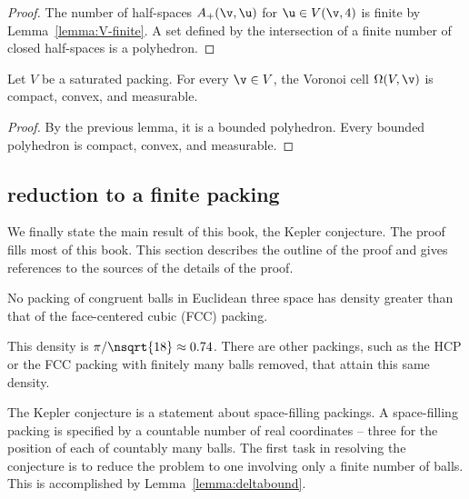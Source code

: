 \begin{cnl}
\begin{proof}
The number of half-spaces $\Aplus(\v,\u)$ for $\u\in \Vee{V}(\v,4)$ is finite by
Lemma~\ref{lemma:V-finite}.  A set defined by the intersection of a finite number
of closed half-spaces is a polyhedron.
\end{proof}

\begin{lemma}
\label{lemma:Voronoi-compact}
Let $ V$ be a saturated packing.  For every $\v\in  V$, 
the Voronoi cell $\Omega( V,\v)$  is
compact, convex, and measurable.
\end{lemma}

\begin{proof} By the previous lemma, it is a bounded polyhedron.
  Every bounded polyhedron is compact, convex, and measurable.
\end{proof}




\subsection{reduction to a finite packing}\label{reduction to finite}

We finally state the main result of this book, the Kepler conjecture.
The proof fills most of this book. This section describes the
outline of the proof and gives references to the sources of the
details of the proof.


\begin{theorem*}
\label{theorem:kepler}
No packing of congruent balls in Euclidean three space has density
greater than that of the face-centered cubic (FCC) packing.
\end{theorem*}
%
%
%
%
%

\begin{remark}
This density is $\pi/\nsqrt{18}\approx 0.74$.  There are other
packings, such as the HCP or the FCC
packing with finitely many balls removed, that attain this
same density.
\end{remark}

The Kepler conjecture is a statement about space-filling packings.  A
space-filling packing is specified by a countable number of real
coordinates -- three for the position of each of countably many balls.
The first task in resolving the conjecture is to reduce the problem to
one involving only a finite number of balls.  This is accomplished by
Lemma~\ref{lemma:deltabound}.


\end{cnl}
